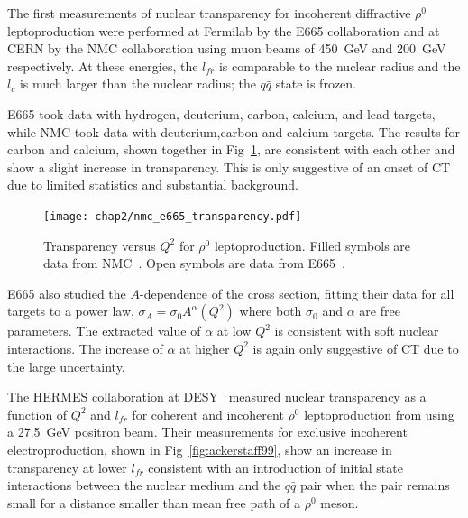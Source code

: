 The first measurements of nuclear transparency for incoherent diffractive
$\rho^0$ leptoproduction were performed
at Fermilab by the E665 collaboration \cite{Adams_1995} and
at CERN by the NMC collaboration \cite{Arneodo_1994}
using muon beams of \SI{450}{\giga\electronvolt} and
\SI{200}{\giga\electronvolt} respectively.
At these energies, the $l_{fr}$ is comparable to the nuclear radius and
the $l_c$ is much larger than the nuclear radius; the $q\bar{q}$
state is frozen.

E665 took data with hydrogen, deuterium, carbon, calcium, and lead targets,
while NMC took data with deuterium,carbon and calcium targets.
The results for carbon and calcium, shown together in
Fig~\ref{fig:nmc_e665_transparency}, are consistent
with each other and show a slight increase in transparency.
This is only suggestive of an onset of CT due to limited statistics and
substantial background.

\begin{figure}[!h]
    \centering
    \texttt{[image: chap2/nmc\_e665\_transparency.pdf]}
    \caption[Transparency versus $Q^2$ for $\rho^0$ leptoproduction.]{Transparency versus $Q^2$ for $\rho^0$ leptoproduction.
             Filled symbols are data from NMC~\cite{Arneodo_1994}.
             Open symbols are data from E665~\cite{Adams_1995}.
            }
    \label{fig:nmc_e665_transparency}
\end{figure}


E665 also studied the $A$-dependence of the cross section, fitting their data
for all targets to a power law, $\sigma_A=\sigma_0A^\alpha(Q^2)$ where both
$\sigma_0$ and $\alpha$ are free parameters.
The extracted value of $\alpha$ at low $Q^2$ is consistent with soft nuclear
interactions.
The increase of $\alpha$ at higher $Q^2$ is again only suggestive of CT due to
the large uncertainty.


The HERMES collaboration at DESY~\cite{Ackerstaff_1999} measured nuclear
transparency as a function of $Q^2$ and $l_{fr}$ for coherent and incoherent
$\rho^0$ leptoproduction from  using a \SI{27.5}{\giga\electronvolt}
positron beam.
Their measurements for exclusive incoherent electroproduction, shown in
Fig~\ref{fig:ackerstaff99}, show an increase in transparency at lower $l_{fr}$ consistent with an
introduction of initial state interactions between the nuclear medium and the
$q\bar{q}$ pair when the pair remains small for a distance smaller than
mean free path of a $\rho^0$ meson.


